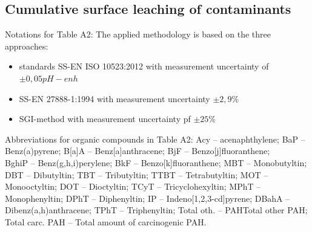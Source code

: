 \documentclass[algorithms,article,submit,pdftex,moreauthors]{Definitions/mdpi}
\begin{document}
\subsection[\appendixname~\thesubsection]{Cumulative surface leaching of contaminants}

Notations for Table A2: The applied methodology is based on the three approaches: 

\begin{itemize}
    \item standards SS-EN ISO 10523:2012 with measurement uncertainty of $\pm 0,05 pH-enh$
    \item SS-EN 27888-1:1994 with measurement uncertainty $\pm2,9\%$ 
    \item SGI-method with measurement uncertainty pf $\pm 25\%$
\end{itemize}

Abbreviations for organic compounds in Table A2: Acy -- acenaphthylene; BaP -- Benz(a)pyrene; B[a]A -- Benz[a]anthracene; BjF -- Benzo[j]fluoranthene; \\BghiP -- Benz(g,h,i)perylene; BkF -- Benzo[k]fluoranthene; MBT -- Monobutyltin; DBT -- Dibutyltin; TBT -- Tributyltin; TTBT -- Tetrabutyltin; MOT -- Monooctyltin; DOT -- Dioctyltin; TCyT -- Tricyclohexyltin; MPhT -- Monophenyltin; DPhT -- Diphenyltin; IP -- Indeno[1,2,3-cd]pyrene; DBahA -- Dibenz(a,h)anthracene; TPhT -- Triphenyltin; Total oth. --  PAHTotal other PAH; Total carc. PAH -- Total amount of carcinogenic PAH. 
\end{document}
